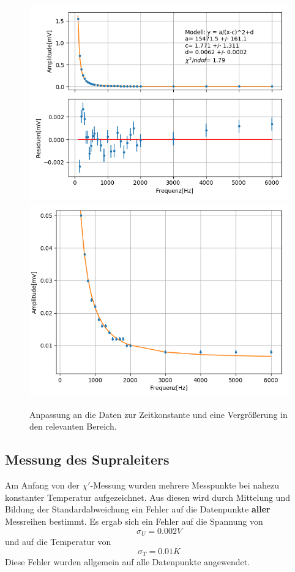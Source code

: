 \documentclass[12pt,a4paper]{article}
\begin{document}
\begin{figure}
\centering
\includegraphics[scale=0.8]{Bilder/Vorversuch4/Vor4_1.png}
\includegraphics[scale=0.8]{Bilder/Vorversuch4/Vor4_2.png}
\caption{Anpassung an die Daten zur Zeitkonstante und eine Vergrößerung in den relevanten Bereich.}
\label{fig:Vor4_anpassung}
\end{figure}

\newpage
\subsection{Messung des Supraleiters}
Am Anfang von der $\chi'$-Messung wurden mehrere Messpunkte bei nahezu konstanter Temperatur aufgezeichnet. Aus diesen wird durch Mittelung und Bildung der Standardabweichung ein Fehler auf die Datenpunkte \textbf{aller} Messreihen bestimmt. Es ergab sich ein Fehler auf die Spannung von
\begin{equation*}
\sigma_U = 0.002V
\end{equation*}
und auf die Temperatur von
\begin{equation*}
\sigma_T = 0.01K
\end{equation*}
Diese Fehler wurden allgemein auf alle Datenpunkte angewendet.
\end{document}
